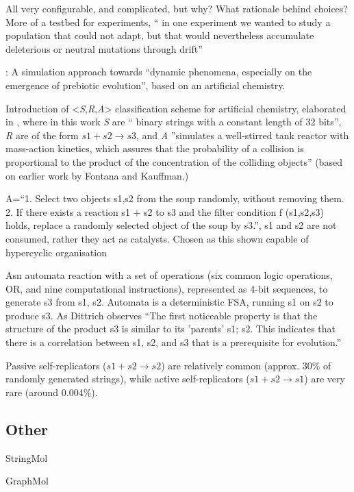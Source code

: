 \begin{NOTES}
All very configurable, and complicated, but why? What rationale behind choices? More of a testbed for experiments, \eg `` in one experiment we wanted to study a population that could not adapt, but that would nevertheless accumulate deleterious or neutral mutations through drift''

\cite{Dittrich1998}:
A simulation approach towards ``dynamic phenomena, especially on the emergence of prebiotic evolution'', based on an artificial chemistry.

Introduction of \textless{}\emph{S},\emph{R},\emph{A}\textgreater{} classification scheme for artificial chemistry, elaborated in \parencite{Dittrich:2001zr}, where in this work \emph{S} are `` binary strings with a constant length of 32 bits'', \emph{R} are of the form $s1+s2 \rightarrow s3$, and \emph{A} ''simulates a well-stirred tank reactor with mass-action kinetics, which assures that the probability of a collision is proportional to the product of the concentration of the colliding objects'' (based on earlier work by Fontana and Kauffman.)

A=``1. Select two objects s1,s2 from the soup randomly, without removing them. 2. If there exists a reaction s1 + s2 to s3 and the filter condition f (s1,s2,s3) holds, replace a randomly selected object of the soup by s3.'', s1 and s2 are not consumed, rather they act as catalysts. Chosen as this shown capable of hypercyclic organisation

Asn automata reaction with a set of operations (six common logic operations, \eg OR, and nine computational instructions), represented as 4-bit sequences, to generate s3 from s1, s2. Automata is a deterministic FSA, running s1 on s2 to produce s3. As Dittrich observes ``The first noticeable property is that the structure of the product s3 is similar to its 'parents' s1; s2. This indicates that there is a correlation between s1, s2, and s3 that is a prerequisite for evolution.''

Passive self-replicators ($s1 + s2 \rightarrow s2$) are relatively common (approx. 30\% of randomly generated strings), while active self-replicators ($s1 + s2 \rightarrow s1$) are very rare (around 0.004\%).

\subsection{Other}
StringMol \parencite{Hickinbotham2011}


GraphMol \parencite{Nellis2012, Nellis2014} 


\end{NOTES}
